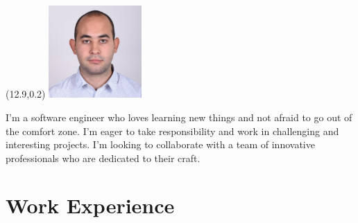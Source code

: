\documentclass[11pt,a4paper,sans]{moderncv}        %
\begin{document}
    \makecvtitle
    \begin{textblock}{0}(12.9,0.2)
    \includegraphics[width=100pt]{picture}\par
    \end{textblock}




    \small{I'm a software engineer who loves learning new things and not afraid to go out of the comfort zone. I'm eager to take responsibility and work in challenging and interesting projects.
    I'm looking to collaborate with a team of innovative professionals who are dedicated to their craft.}

    \section{Work Experience}

    \vspace{6pt}
\end{document}

